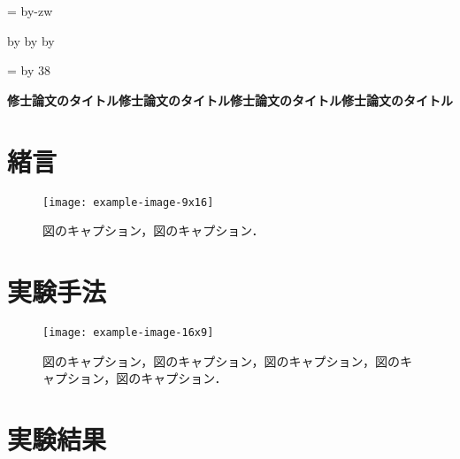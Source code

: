 \documentclass[11pt,dvipdfmx,svgnames,a4paper,uplatex]{ujarticle}
\makeatletter
\def\mojiparline#1{
  \newcounter{mpl}
  \setcounter{mpl}{#1}
  \@tempdima=\linewidth
  \advance\@tempdima by-\value{mpl}zw
  \addtocounter{mpl}{-1}
  \divide\@tempdima by \value{mpl}
  \advance\kanjiskip by\@tempdima
  \advance\parindent by\@tempdima
}
\def\linesparpage#1{
  \baselineskip=\textheight
  \divide\baselineskip by #1
}
\makeatother
\begin{document}
\mojiparline{42}  %
\linesparpage{38}  %

\centerline{\textbf{
  修士論文のタイトル修士論文のタイトル修士論文のタイトル修士論文のタイトル
}}

\section{緒言}

\begin{wrapfigure}{r}{12zw}
  \vspace*{-\intextsep}
  \centering
  \texttt{[image: example-image-9x16]}
  \caption{
    図のキャプション，図のキャプション．%
  }
  \label{fig:introduction}
  \vspace*{-1.0zh} %
\end{wrapfigure}

\textcolor{LightGray}{
}


\section{実験手法}  %

\begin{wrapfigure}{r}{26zw}
  \vspace*{-1.0zh} %
  \centering
  \texttt{[image: example-image-16x9]}
  \caption{
    図のキャプション，図のキャプション，図のキャプション，図のキャプション，図のキャプション．
  }
  \label{fig:experiment}
  \vspace*{-\intextsep}
\end{wrapfigure}

\textcolor{LightGray}{
}


\section{実験結果}  %
\end{document}
